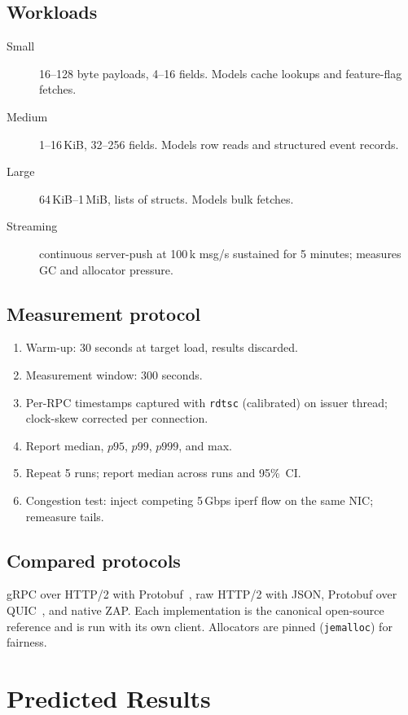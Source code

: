 \documentclass[11pt]{article}
\theoremstyle{definition}
\theoremstyle{remark}
\begin{document}
\subsection{Workloads}
\begin{description}
  \item[Small] 16--128 byte payloads, 4--16 fields. Models cache lookups
    and feature-flag fetches.
  \item[Medium] 1--16\,KiB, 32--256 fields. Models row reads and
    structured event records.
  \item[Large] 64\,KiB--1\,MiB, lists of structs. Models bulk fetches.
  \item[Streaming] continuous server-push at 100\,k msg/s sustained for
    5 minutes; measures GC and allocator pressure.
\end{description}

\subsection{Measurement protocol}
\begin{enumerate}
  \item Warm-up: 30 seconds at target load, results discarded.
  \item Measurement window: 300 seconds.
  \item Per-RPC timestamps captured with \texttt{rdtsc} (calibrated)
        on issuer thread; clock-skew corrected per connection.
  \item Report median, $p95$, $p99$, $p999$, and max.
  \item Repeat 5 runs; report median across runs and 95\%\ CI.
  \item Congestion test: inject competing 5\,Gbps iperf flow on the
        same NIC; remeasure tails.
\end{enumerate}

\subsection{Compared protocols}
gRPC over HTTP/2 with Protobuf~\cite{grpc,rfc9113}, raw HTTP/2 with
JSON, Protobuf over QUIC~\cite{rfc9000}, and native ZAP. Each
implementation is the canonical open-source reference and is run with
its own client. Allocators are pinned (\texttt{jemalloc}) for fairness.

\section{Predicted Results}
\label{sec:results}
\end{document}
